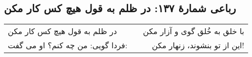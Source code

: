 \begin{center}
\section*{رباعی شمارهٔ ۱۳۷:  در ظلم به قول هیچ کس کار مکن}
\label{sec:137}
\begin{longtable}{l p{0.5cm} r}
 در ظلم به قول هیچ کس کار مکن
&&
با خلق به خُلق گوی و آزار مکن
\\
فردا گویی: من چه کنم؟ او می گفت:
&&
این از تو بنشوند، زنهار مکن!
\\
\end{longtable}
\end{center}
